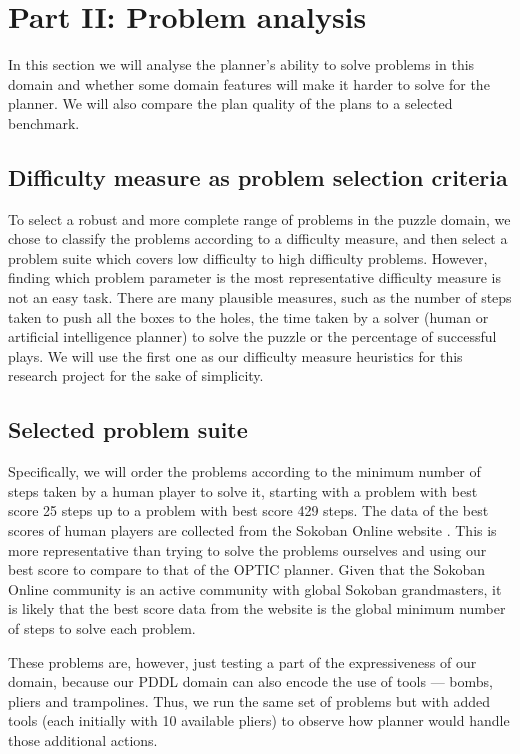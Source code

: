 \documentclass[letterpaper]{article} %
\begin{document}
\section{Part II: Problem analysis}
In this section we will analyse the planner's ability to solve problems in this domain and whether some domain features will
make it harder to solve for the planner. We will also compare the plan quality of the plans to a selected benchmark.

\subsection{Difficulty measure as problem selection criteria}
To select a robust and more complete range of problems in the puzzle domain, we chose to classify the problems according
 to a difficulty measure, and then select a problem suite which covers low difficulty to high difficulty problems.
 However, finding which problem parameter is the most representative difficulty measure is not an easy task. There are many plausible measures, such as
  the number of steps taken to push all the boxes to the holes, the time taken by a solver (human or artificial
  intelligence planner) to solve the puzzle or the percentage of successful plays. We will use the first one as our
  difficulty measure heuristics for this research project for the sake of simplicity.

\subsection{Selected problem suite}
Specifically, we will order the problems according to the
minimum number of steps
taken by a human player to solve it, starting with a
problem with best score 25 steps up to a problem with
best score 429 steps. The data of the best scores of
human players are collected from the Sokoban Online website \cite{microban}.
This is more representative than trying to solve the
problems ourselves and using our best score to compare
to that of the OPTIC planner. Given that the Sokoban Online
community is an active community with global Sokoban
grandmasters, it is likely that the best score data
from the website is the global minimum number of steps
to solve each problem.

These problems are, however, just testing a part of
the expressiveness of our domain, because our PDDL
domain can also encode the use of tools ---
bombs, pliers and trampolines. Thus, we run the same set
of problems but with added tools (each initially
with 10 available pliers) to observe how planner
would handle those additional actions.
\end{document}

